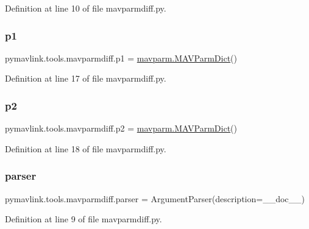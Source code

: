 Definition at line 10 of file mavparmdiff.\+py.

\mbox{\label{namespacepymavlink_1_1tools_1_1mavparmdiff_a06d51c19c63d03d6f2853641ffa5255a}} 
\subsubsection{\texorpdfstring{p1}{p1}}
{\footnotesize\ttfamily pymavlink.\+tools.\+mavparmdiff.\+p1 = \mbox{\hyperlink{classpymavlink_1_1mavparm_1_1MAVParmDict}{mavparm.\+M\+A\+V\+Parm\+Dict}}()}



Definition at line 17 of file mavparmdiff.\+py.

\mbox{\label{namespacepymavlink_1_1tools_1_1mavparmdiff_a9f0235810198201674e23d7c0e6d4f3b}} 
\subsubsection{\texorpdfstring{p2}{p2}}
{\footnotesize\ttfamily pymavlink.\+tools.\+mavparmdiff.\+p2 = \mbox{\hyperlink{classpymavlink_1_1mavparm_1_1MAVParmDict}{mavparm.\+M\+A\+V\+Parm\+Dict}}()}



Definition at line 18 of file mavparmdiff.\+py.

\mbox{\label{namespacepymavlink_1_1tools_1_1mavparmdiff_ab64e4537cb0136a6e8bf263f627bb94d}} 
\subsubsection{\texorpdfstring{parser}{parser}}
{\footnotesize\ttfamily pymavlink.\+tools.\+mavparmdiff.\+parser = Argument\+Parser(description=\+\_\+\+\_\+doc\+\_\+\+\_\+)}



Definition at line 9 of file mavparmdiff.\+py.

